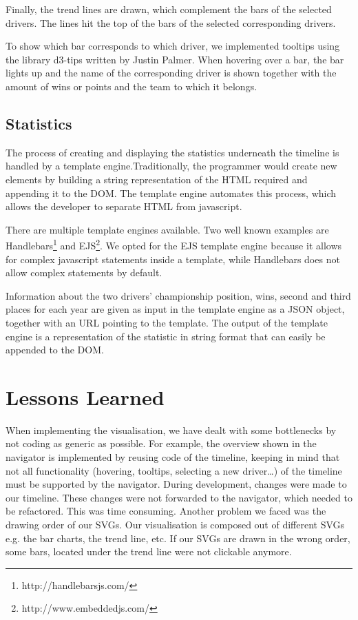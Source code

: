 \documentclass{sigchi}
\begin{document}
Finally, the trend lines are drawn, which complement the bars of the selected drivers. The lines hit the top of the bars of the selected corresponding drivers.

To show which bar corresponds to which driver, we implemented tooltips using the library d3-tips\cite{records} written by Justin Palmer. When hovering over a bar, the bar lights up and the name of the corresponding driver is shown together with the amount of wins or points and the team to which it belongs.



\subsection{Statistics} 

The process of creating and displaying the statistics underneath the timeline is handled by a template engine.Traditionally, the programmer would create new elements by building a string representation of the HTML required and appending it to the DOM. The template engine automates this process, which allows the developer to separate HTML from javascript. 

There are multiple template engines available. Two well known examples are Handlebars\footnote{http://handlebarsjs.com/}  and EJS\footnote{http://www.embeddedjs.com/}. We opted for the EJS template engine because it allows for complex javascript statements inside a template, while Handlebars does not allow complex statements by default. 

Information about the two drivers' championship position, wins, second and third places for each year are given as input in the template engine as a JSON object, together with an URL pointing to the template. The output of the template engine is a representation of the statistic in string format that can easily be appended to the DOM.



\section{Lessons Learned}

When implementing the visualisation, we have dealt with some bottlenecks by not coding as generic as possible. For example, the overview shown in the navigator is implemented by reusing code of the timeline, keeping in mind that not all functionality (hovering, tooltips, selecting a new driver…) of the timeline must be supported by the navigator. During development, changes were made to our timeline. These changes were not forwarded to the navigator, which needed to be refactored. This was time consuming.
Another problem we faced was the drawing order of our SVGs. Our visualisation is composed out of different SVGs e.g. the bar charts, the trend line, etc. If our SVGs are drawn in the wrong order, some bars, located under the trend line were not clickable anymore.
\end{document}
